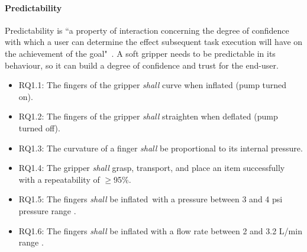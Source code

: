 \documentclass[lettersize,journal]{IEEEtran}
\begin{document}
\paragraph{Predictability}\label{predictability}
Predictability is ``a property of interaction concerning the degree of confidence with which a user can determine the effect subsequent task execution will have on the achievement of the goal"~\cite{Abowd1991}. A soft gripper needs to be predictable in its behaviour, so it can build a degree of confidence and trust for the end-user. 
\begin{itemize}
	\item RQ1.1: The fingers of the gripper \emph{shall} curve when inflated (pump turned on).  
	\item RQ1.2: The fingers of the gripper \emph{shall} straighten when deflated (pump turned off).  
	\item RQ1.3: The curvature of a finger \emph{shall} be proportional to its internal pressure. 
	\item RQ1.4: The gripper \emph{shall} grasp, transport, and place an item successfully with a repeatability of $\ge$95\%.
	\item RQ1.5: The fingers \emph{shall} be inflated with a pressure between 3 and 4 psi pressure range \cite{Partridge2022}. 
	\item RQ1.6: The fingers \emph{shall} be inflated with a flow rate between 2 and 3.2 L/min range \cite{DEWIN2022}.
\end{itemize}
\end{document}
